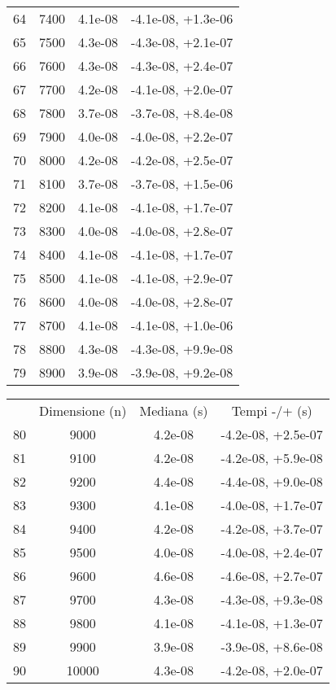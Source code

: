 \begin{table}
\begin{adjustbox}{width=1\textwidth/2}
\begin{tabular}{|c|c|c|c|}
\cline{1-4}
64 & 7400 & 4.1e-08 & -4.1e-08, +1.3e-06 \\
\cline{1-4}
65 & 7500 & 4.3e-08 & -4.3e-08, +2.1e-07 \\
\cline{1-4}
66 & 7600 & 4.3e-08 & -4.3e-08, +2.4e-07 \\
\cline{1-4}
67 & 7700 & 4.2e-08 & -4.1e-08, +2.0e-07 \\
\cline{1-4}
68 & 7800 & 3.7e-08 & -3.7e-08, +8.4e-08 \\
\cline{1-4}
69 & 7900 & 4.0e-08 & -4.0e-08, +2.2e-07 \\
\cline{1-4}
70 & 8000 & 4.2e-08 & -4.2e-08, +2.5e-07 \\
\cline{1-4}
71 & 8100 & 3.7e-08 & -3.7e-08, +1.5e-06 \\
\cline{1-4}
72 & 8200 & 4.1e-08 & -4.1e-08, +1.7e-07 \\
\cline{1-4}
73 & 8300 & 4.0e-08 & -4.0e-08, +2.8e-07 \\
\cline{1-4}
74 & 8400 & 4.1e-08 & -4.1e-08, +1.7e-07 \\
\cline{1-4}
75 & 8500 & 4.1e-08 & -4.1e-08, +2.9e-07 \\
\cline{1-4}
76 & 8600 & 4.0e-08 & -4.0e-08, +2.8e-07 \\
\cline{1-4}
77 & 8700 & 4.1e-08 & -4.1e-08, +1.0e-06 \\
\cline{1-4}
78 & 8800 & 4.3e-08 & -4.3e-08, +9.9e-08 \\
\cline{1-4}
79 & 8900 & 3.9e-08 & -3.9e-08, +9.2e-08 \\
\cline{1-4}
\end{tabular}
\end{adjustbox}
\end{table}

\begin{table}
\centering
\begin{adjustbox}{width=1\textwidth/2}
\begin{tabular}{|c|c|c|c|}
\hline
 & Dimensione (n) & Mediana (s) & Tempi -/+ (s) \\
80 & 9000 & 4.2e-08 & -4.2e-08, +2.5e-07 \\
\cline{1-4}
81 & 9100 & 4.2e-08 & -4.2e-08, +5.9e-08 \\
\cline{1-4}
82 & 9200 & 4.4e-08 & -4.4e-08, +9.0e-08 \\
\cline{1-4}
83 & 9300 & 4.1e-08 & -4.0e-08, +1.7e-07 \\
\cline{1-4}
84 & 9400 & 4.2e-08 & -4.2e-08, +3.7e-07 \\
\cline{1-4}
85 & 9500 & 4.0e-08 & -4.0e-08, +2.4e-07 \\
\cline{1-4}
86 & 9600 & 4.6e-08 & -4.6e-08, +2.7e-07 \\
\cline{1-4}
87 & 9700 & 4.3e-08 & -4.3e-08, +9.3e-08 \\
\cline{1-4}
88 & 9800 & 4.1e-08 & -4.1e-08, +1.3e-07 \\
\cline{1-4}
89 & 9900 & 3.9e-08 & -3.9e-08, +8.6e-08 \\
\cline{1-4}
90 & 10000 & 4.3e-08 & -4.2e-08, +2.0e-07 \\
\cline{1-4}
\end{tabular}
\end{adjustbox}
\end{table}
